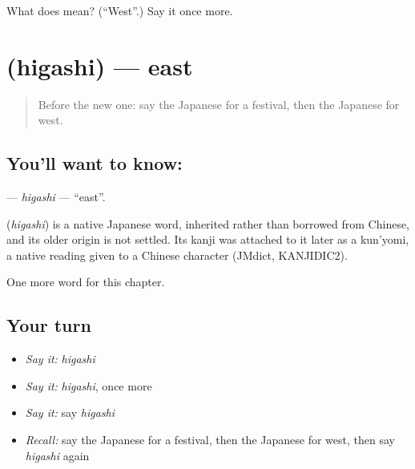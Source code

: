 \begin{tcolorbox}[breakable,colback=teal!4,colframe=teal!35!black,title={Before you move on}]
What does  mean? (\textquotedblleft{}West\textquotedblright{}.) Say it once more.
\end{tcolorbox}
\section[\texorpdfstring{\ja{ひがし} (higashi)}{ひがし (higashi)}]{ (higashi) — east}

\label{lesson:JA-C63-higashi}



\begin{quote}
Before the new one: say the Japanese for a festival, then the Japanese for west.
\end{quote}

\subsection*{You'll want to know: }
\textbf{} — \emph{higashi} — \textquotedblleft{}east\textquotedblright{}.

\begin{cousinweb}
\textbf{} (\emph{higashi}) is a native Japanese word, inherited rather than borrowed from Chinese, and its older origin is not settled. Its kanji was attached to it later as a kun'yomi, a native reading given to a Chinese character (JMdict, KANJIDIC2).
\end{cousinweb}

\begin{grammarlens}[title={What you've built}]
One more word for this chapter.
\end{grammarlens}

\subsection*{Your turn}
\begin{itemize}
\raggedright
  \item \emph{Say it:} \emph{higashi}
  \item \emph{Say it:} \emph{higashi}, once more
  \item \emph{Say it:} say \emph{higashi}
  \item \emph{Recall:} say the Japanese for a festival, then the Japanese for west, then say \emph{higashi} again
\end{itemize}

